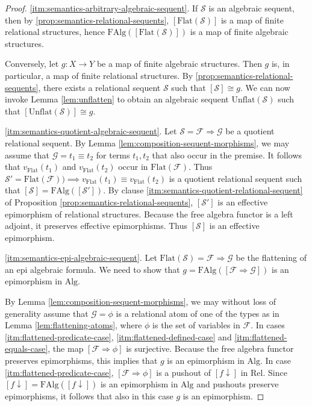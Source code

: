 \documentclass[a4paper]{article}
\theoremstyle{remark}
\theoremstyle{definition}
\begin{document}
\begin{proof}
  \ref{itm:semantics-arbitrary-algebraic-sequent}.
  If $\mathcal{S}$ is an algebraic sequent, then by \ref{prop:semantics-relational-sequents}, $[\mathrm{Flat}(\mathcal{S})]$ is a map of finite relational structures, hence $\mathrm{FAlg}([\mathrm{Flat}(\mathcal{S})])$ is a map of finite algebraic structures.

  Conversely, let $g : X \rightarrow Y$ be a map of finite algebraic structures.
  Then $g$ is, in particular, a map of finite relational structures.
  By \ref{prop:semantics-relational-sequents}, there exists a relational sequent $\mathcal{S}$ such that $[\mathcal{S}] \cong g$.
  We can now invoke Lemma \ref{lem:unflatten} to obtain an algebraic sequent $\mathrm{Unflat}(\mathcal{S})$ such that $[\mathrm{Unflat}(\mathcal{S})] \cong g$.

  \ref{itm:semantics-quotient-algebraic-sequent}.
  Let $\mathcal{S} = \mathcal{F} \Rightarrow \mathcal{G}$ be a quotient relational sequent.
  By Lemma \ref{lem:composition-sequent-morphisms}, we may assume that $\mathcal{G} = t_1 \equiv t_2$ for terms $t_1, t_2$ that also occur in the premise.
  It follows that $v_\mathrm{Flat}(t_1)$ and $v_\mathrm{Flat}(t_2)$ occur in $\mathrm{Flat}(\mathcal{F})$.
  Thus $\mathcal{S}' = \mathrm{Flat}(\mathcal{F})) \implies v_\mathrm{Flat}(t_1) \equiv v_\mathrm{Flat}(t_2)$ is a quotient relational sequent such that $[\mathcal{S}] = \mathrm{FAlg}([\mathcal{S}'])$.
  By clause \ref{itm:semantics-quotient-relational-sequent} of Proposition \ref{prop:semantics-relational-sequents}, $[\mathcal{S}']$ is an effective epimorphism of relational structures.
  Because the free algebra functor is a left adjoint, it preserves effective epimorphisms.
  Thus $[\mathcal{S}]$ is an effective epimorphism.

  \ref{itm:semantics-epi-algebraic-sequent}.
  Let $\mathrm{Flat}(\mathcal{S}) = \mathcal{F} \Rightarrow \mathcal{G}$ be the flattening of an epi algebraic formula.
  We need to show that $g = \mathrm{FAlg}([\mathcal{F} \Rightarrow \mathcal{G}])$ is an epimorphism in $\mathrm{Alg}$.

  By Lemma \ref{lem:composition-sequent-morphisms}, we may without loss of generality assume that $\mathcal{G} = \mathcal{\phi}$ is a relational atom of one of the types as in Lemma \ref{lem:flattening-atoms}, where $\phi$ is the set of variables in $\mathcal{F}$.
  In cases \ref{itm:flattened-predicate-case}, \ref{itm:flattened-defined-case} and \ref{itm:flattened-equals-case}, the map $[\mathcal{F} \Rightarrow \phi]$ is surjective. 
  Because the free algebra functor preserves epimorphisms, this implies that $g$ is an epimorphism in $\mathrm{Alg}$.
  In case \ref{itm:flattened-predicate-case}, $[\mathcal{F} \Rightarrow \phi]$ is a pushout of $[f \downarrow]$ in $\mathrm{Rel}$.
  Since $[f \downarrow] = \mathrm{FAlg}([f \downarrow])$ is an epimorphism in $\mathrm{Alg}$ and pushouts preserve epimorphisms, it follows that also in this case $g$ is an epimorphism.


\end{proof}
\end{document}
